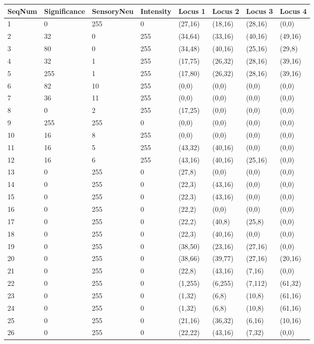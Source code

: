 \documentclass{article}
\begin{document}
\begin{longtable}{|p{2cm}|p{2cm}|p{2cm}|p{2cm}|p{2cm}|p{2cm}|p{2cm}|p{2cm}|}
\hline
{\bf SeqNum} & {\bf Significance} & {\bf SensoryNeu} & {\bf Intensity} & {\bf Locus 1} & {\bf Locus 2} & {\bf Locus 3} & {\bf Locus 4} \\ \hline
1 & 0 & 255 & 0 & (27,16) & (18,16) & (28,16) & (0,0) \\ \hline
2 & 32 & 0 & 255 & (34,64) & (33,16) & (40,16) & (49,16) \\ \hline
3 & 80 & 0 & 255 & (34,48) & (40,16) & (25,16) & (29,8) \\ \hline
4 & 32 & 1 & 255 & (17,75) & (26,32) & (28,16) & (39,16) \\ \hline
5 & 255 & 1 & 255 & (17,80) & (26,32) & (28,16) & (39,16) \\ \hline
6 & 82 & 10 & 255 & (0,0) & (0,0) & (0,0) & (0,0) \\ \hline
7 & 36 & 11 & 255 & (0,0) & (0,0) & (0,0) & (0,0) \\ \hline
8 & 0 & 2 & 255 & (17,25) & (0,0) & (0,0) & (0,0) \\ \hline
9 & 255 & 255 & 0 & (0,0) & (0,0) & (0,0) & (0,0) \\ \hline
10 & 16 & 8 & 255 & (0,0) & (0,0) & (0,0) & (0,0) \\ \hline
11 & 16 & 5 & 255 & (43,32) & (40,16) & (0,0) & (0,0) \\ \hline
12 & 16 & 6 & 255 & (43,16) & (40,16) & (25,16) & (0,0) \\ \hline
13 & 0 & 255 & 0 & (27,8) & (0,0) & (0,0) & (0,0) \\ \hline
14 & 0 & 255 & 0 & (22,3) & (43,16) & (0,0) & (0,0) \\ \hline
15 & 0 & 255 & 0 & (22,3) & (43,16) & (0,0) & (0,0) \\ \hline
16 & 0 & 255 & 0 & (22,2) & (0,0) & (0,0) & (0,0) \\ \hline
17 & 0 & 255 & 0 & (22,2) & (40,8) & (25,8) & (0,0) \\ \hline
18 & 0 & 255 & 0 & (22,3) & (40,16) & (0,0) & (0,0) \\ \hline
19 & 0 & 255 & 0 & (38,50) & (23,16) & (27,16) & (0,0) \\ \hline
20 & 0 & 255 & 0 & (38,66) & (39,77) & (27,16) & (20,16) \\ \hline
21 & 0 & 255 & 0 & (22,8) & (43,16) & (7,16) & (0,0) \\ \hline
22 & 0 & 255 & 0 & (1,255) & (6,255) & (7,112) & (61,32) \\ \hline
23 & 0 & 255 & 0 & (1,32) & (6,8) & (10,8) & (61,16) \\ \hline
24 & 0 & 255 & 0 & (1,32) & (6,8) & (10,8) & (61,16) \\ \hline
25 & 0 & 255 & 0 & (21,16) & (36,32) & (6,16) & (10,16) \\ \hline
26 & 0 & 255 & 0 & (22,22) & (43,16) & (7,32) & (0,0) \\ \hline
\end{longtable}
\end{document}
